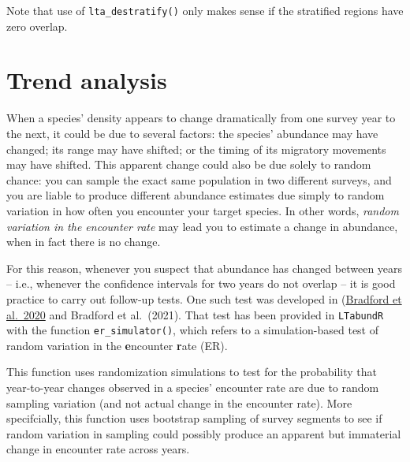 \documentclass[
]{book}
\newenvironment{Shaded}{\begin{snugshade}}{\end{snugshade}}
\newcommand{\ControlFlowTok}[1]{\textcolor[rgb]{0.13,0.29,0.53}{\textbf{#1}}}
\newcommand{\DataTypeTok}[1]{\textcolor[rgb]{0.13,0.29,0.53}{#1}}
\newcommand{\KeywordTok}[1]{\textcolor[rgb]{0.13,0.29,0.53}{\textbf{#1}}}
\newcommand{\NormalTok}[1]{#1}
\newcommand{\OperatorTok}[1]{\textcolor[rgb]{0.81,0.36,0.00}{\textbf{#1}}}
\newcommand{\OtherTok}[1]{\textcolor[rgb]{0.56,0.35,0.01}{#1}}
\newcommand{\StringTok}[1]{\textcolor[rgb]{0.31,0.60,0.02}{#1}}
\begin{document}
\begin{Shaded}
\end{Shaded}

Note that use of \texttt{lta\_destratify()} only makes sense if the stratified regions have zero overlap.

\hypertarget{trend-analysis}{%
\chapter{Trend analysis}\label{trend-analysis}}

When a species' density appears to change dramatically from one survey year to the next, it could be due to several factors: the species' abundance may have changed; its range may have shifted; or the timing of its migratory movements may have shifted. This apparent change could also be due solely to random chance: you can sample the exact same population in two different surveys, and you are liable to produce different abundance estimates due simply to random variation in how often you encounter your target species. In other words, \emph{random variation in the encounter rate} may lead you to estimate a change in abundance, when in fact there is no change.

For this reason, whenever you suspect that abundance has changed between years -- i.e., whenever the confidence intervals for two years do not overlap -- it is good practice to carry out follow-up tests. One such test was developed in (\href{https://www.fisheries.noaa.gov/inport/item/59592}{Bradford et al.~2020} and Bradford et al.~(2021). That test has been provided in \texttt{LTabundR} with the function \texttt{er\_simulator()}, which refers to a simulation-based test of random variation in the \textbf{e}ncounter \textbf{r}ate (ER).

This function uses randomization simulations to test for the probability that year-to-year changes observed in a species' encounter rate are due to random sampling variation (and not actual change in the encounter rate). More specifcially, this function uses bootstrap sampling of survey segments to see if random variation in sampling could possibly produce an apparent but immaterial change in encounter rate across years.
\end{document}
